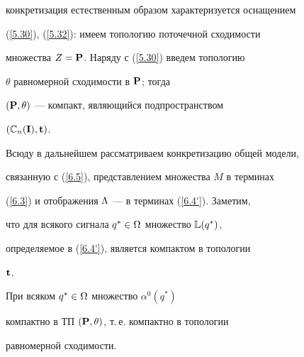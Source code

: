 конкретизация естественным образом характеризуется оснащением


(\ref{5.30}), (\ref{5.32}): имеем топологию поточечной сходимости


множества $Z = \bold{P}$. Наряду с (\ref{5.30}) введем топологию


$\theta$ равномерной сходимости в $\bold{P}$; тогда


$(\bold{P},\theta)$ --- компакт, являющийся подпространством


$({\Bbb{C}_n}(\bold{I}),\bold{t})$.





Всюду в дальнейшем рассматриваем конкретизацию общей модели,


связанную с (\ref{6.5}), представлением множества $M$ в терминах


(\ref{6.3}) и отображения $\Lambda$ --- в терминах (\ref{6.4'}). Заметим,


что для всякого сигнала $q^* \in \Omega$ множество $\Bbb{L}(q^*)$,


определяемое в (\ref{6.4'}), является компактом в топологии


$\bold{t}$.








\begin{props}


При всяком ${q^*} \in \Omega$ множество ${{\alpha}^0}(q^*)$


компактно в ТП $(\bold{P},\theta)$, т.\,е. компактно в топологии


равномерной сходимости.


\end{props}








